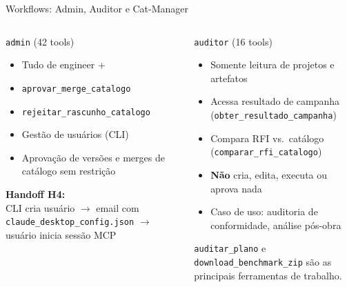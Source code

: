 \documentclass[aspectratio=169,10pt]{beamer}
\newcommand{\role}[1]{\texttt{\small #1}}
\begin{document}
\begin{frame}{Workflows: Admin, Auditor e Cat-Manager}
  \begin{columns}[T]
    \begin{block}{\role{admin} (42 tools)}
      \begin{itemize}\scriptsize
        \item Tudo de engineer +
        \item \texttt{aprovar\_merge\_catalogo}
        \item \texttt{rejeitar\_rascunho\_catalogo}
        \item Gestão de usuários (CLI)
        \item Aprovação de versões e merges de catálogo sem restrição
      \end{itemize}
      \vspace{4pt}
      \textbf{Handoff H4:}\\
      {\scriptsize CLI cria usuário $\to$ email com \texttt{claude\_desktop\_config.json} $\to$ usuário inicia sessão MCP}
    \end{block}

    \begin{block}{\role{auditor} (16 tools)}
      \begin{itemize}\scriptsize
        \item Somente leitura de projetos e artefatos
        \item Acessa resultado de campanha (\texttt{obter\_resultado\_campanha})
        \item Compara RFI vs.\ catálogo (\texttt{comparar\_rfi\_catalogo})
        \item \textbf{Não} cria, edita, executa ou aprova nada
        \item Caso de uso: auditoria de conformidade, análise pós-obra
      \end{itemize}
      \vspace{4pt}
      {\scriptsize \texttt{auditar\_plano} e \texttt{download\_benchmark\_zip} são as
      principais ferramentas de trabalho.}
    \end{block}


\end{columns}
\end{frame}
\end{document}
